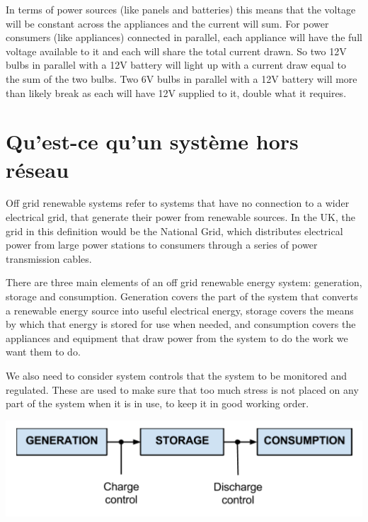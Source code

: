 \documentclass{article}
\theoremstyle{definition}
\theoremstyle{definition}
\theoremstyle{remark}
\begin{document}
    In terms of power sources (like panels and batteries) this means that the voltage will be constant across the appliances and the current will sum. For power consumers (like appliances) connected in parallel, each appliance will have the full voltage available to it and each will share the total current drawn. So two 12V bulbs in parallel with a 12V battery will light up with a current draw equal to the sum of the two bulbs. Two 6V bulbs in parallel with a 12V battery will more than likely break as each will have 12V supplied to it, double what it requires. 
  


{\color{blue}\section{Qu'est-ce qu'un système hors réseau}} %
\label{sec:qu_est_ce_qu_un_systeme_hors_reseau}

  Off grid renewable systems refer to systems that have no connection to a wider electrical grid, that generate their power from renewable sources. In the UK, the grid in this definition would be the National Grid, which distributes electrical power from large power stations to consumers through a series of power transmission cables.

  There are three main elements of an off grid renewable energy system: generation, storage and consumption. Generation covers the part of the system that converts a renewable energy source into useful electrical energy, storage covers the means by which that energy is stored for use when needed, and consumption covers the appliances and equipment that draw power from the system to do the work we want them to do.

  We also need to consider system controls that the system to be monitored and regulated. These are used to make sure that too much stress is not placed on any part of the system when it is in use, to keep it in good working order.

  \begin{center}
    \includegraphics[width=0.60\paperwidth]{Images/image_3_1_(off_grid_diagram).png}
  \end{center}
\end{document}
